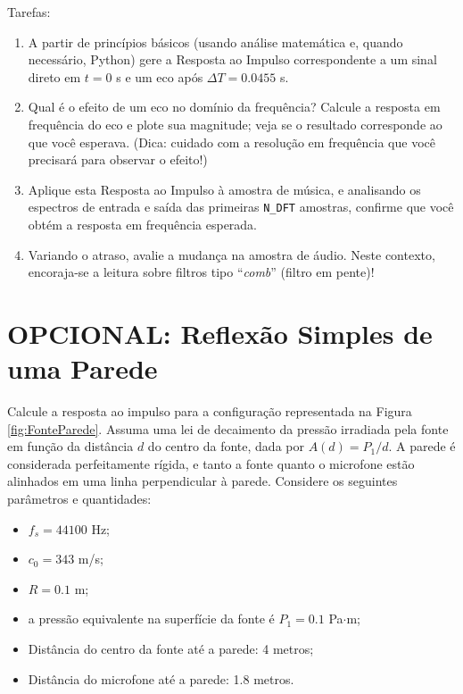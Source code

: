 \documentclass[a4paper,twoside,12pt]{article}
\begin{document}
	Tarefas:
	\begin{enumerate}
		\item A partir de princípios básicos (usando análise matemática e, quando necessário, Python) gere a Resposta ao Impulso correspondente a um sinal direto em $t=0$ s e um eco após $\Delta T = 0.0455$ s.
		
		\item Qual é o efeito de um eco no domínio da frequência? Calcule a resposta em frequência do eco e plote sua magnitude; veja se o resultado corresponde ao que você esperava. (Dica: cuidado com a resolução em frequência que você precisará para observar o efeito!)
		
		\item Aplique esta Resposta ao Impulso à amostra de música, e analisando os espectros de entrada e saída das primeiras {\tt N\_DFT} amostras, confirme que você obtém a resposta em frequência esperada.
		
		\item Variando o atraso, avalie a mudança na amostra de áudio. Neste contexto, encoraja-se a leitura sobre filtros tipo ``\emph{comb}'' (filtro em pente)!
	\end{enumerate}
	
	\section{OPCIONAL: Reflexão Simples de uma Parede}
	Calcule a resposta ao impulso para a configuração representada na Figura \ref{fig:FonteParede}. Assuma uma lei de decaimento da pressão irradiada pela fonte em função da distância $d$ do centro da fonte, dada por $A(d) = P_1 / d$. A parede é considerada perfeitamente rígida, e tanto a fonte quanto o microfone estão alinhados em uma linha perpendicular à parede. Considere os seguintes parâmetros e quantidades:
	\begin{itemize}
		\item $f_s = 44100$ Hz;
		\item $c_0 = 343$ m/s;
		\item $R = 0.1$ m;
		\item a pressão equivalente na superfície da fonte é $P_1 = 0.1$ Pa$\cdot$m;
		\item Distância do centro da fonte até a parede: 4 metros;
		\item Distância do microfone até a parede: 1.8 metros.
	\end{itemize}
	
\end{document}
